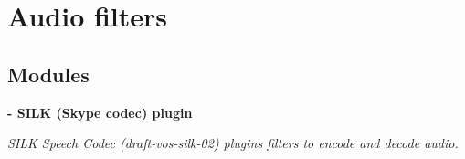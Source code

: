 \section{Audio filters}
\label{group__audiofilters}
\subsection*{Modules}
\begin{DoxyCompactItemize}
\item 
{\bf -\/ SILK (Skype codec)  plugin}


\begin{DoxyCompactList}\small\item\em SILK Speech Codec (draft-\/vos-\/silk-\/02) plugins filters to encode and decode audio. \item\end{DoxyCompactList}\end{DoxyCompactItemize}
